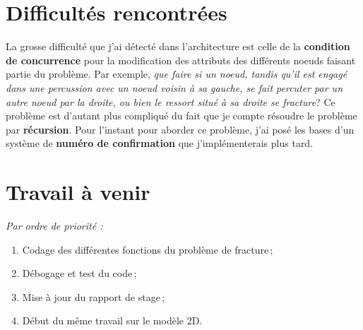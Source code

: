 \documentclass[
  french,
	11pt, %
]{fphw}
\begin{document}
\section*{Difficultés rencontrées}


La grosse difficulté que j'ai détecté dans l'architecture est celle de la \textbf{condition de concurrence} pour la modification des attributs des différents noeuds faisant partie du problème. Par exemple, \textit{que faire si un noeud, tandis qu'il est engagé dans une percussion avec un noeud voisin à sa gauche, se fait percuter par un autre noeud par la droite, ou bien le ressort situé à sa droite se fracture}? Ce problème est d'autant plus compliqué du fait que je compte résoudre le problème par \textbf{récursion}. Pour l'instant pour aborder ce problème, j’ai posé les bases d'un système de \textbf{numéro de confirmation} que j'implémenterais plus tard.



\section*{Travail à venir}

\emph{Par ordre de priorité :}

\begin{enumerate}
  \item Codage des différentes fonctions du problème de fracture ;
  \item Débogage et test du code ;
  \item Mise à jour du rapport de stage ;
  \item Début du même travail sur le modèle 2D.
\end{enumerate}



\clearpage   %
\printbibliography
\end{document}

